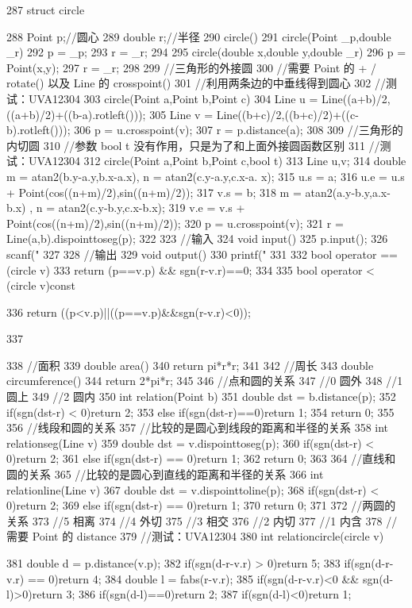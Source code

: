 \documentclass[11pt]{article}
\begin{document}
\begin{Code}
287 struct circle{
288     Point p;//圆心
289     double r;//半径
290     circle(){}
291     circle(Point _p,double _r){
292         p = _p;
293         r = _r;
294     }
295     circle(double x,double y,double _r){
296         p = Point(x,y);
297         r = _r;
298     }
299     //三角形的外接圆
300     //需要 Point 的 + / rotate() 以及 Line 的 crosspoint()
301     //利用两条边的中垂线得到圆心
302     //测试：UVA12304
303     circle(Point a,Point b,Point c){
304         Line u = Line((a+b)/2,((a+b)/2)+((b-a).rotleft()));
305         Line v = Line((b+c)/2,((b+c)/2)+((c-b).rotleft()));
306         p = u.crosspoint(v);
307         r = p.distance(a);
308     }
309     //三角形的内切圆
310     //参数 bool t 没有作用，只是为了和上面外接圆函数区别
311     //测试：UVA12304
312     circle(Point a,Point b,Point c,bool t){
313         Line u,v;
314         double m = atan2(b.y-a.y,b.x-a.x), n = atan2(c.y-a.y,c.x-a.
               x);
315         u.s = a;
316         u.e = u.s + Point(cos((n+m)/2),sin((n+m)/2));
317         v.s = b;
318         m = atan2(a.y-b.y,a.x-b.x) , n = atan2(c.y-b.y,c.x-b.x);
319         v.e = v.s + Point(cos((n+m)/2),sin((n+m)/2));
320         p = u.crosspoint(v);
321         r = Line(a,b).dispointtoseg(p);
322     }
323     //输入
324     void input(){
325         p.input();
326         scanf("%
327     }
328     //输出
329     void output(){
330         printf("%
331     }
332     bool operator == (circle v){
333         return (p==v.p) && sgn(r-v.r)==0;
334     }
335     bool operator < (circle v)const{
336         return ((p<v.p)||((p==v.p)&&sgn(r-v.r)<0));


337       }
338       //面积
339       double area(){
340           return pi*r*r;
341       }
342       //周长
343       double circumference(){
344           return 2*pi*r;
345       }
346       //点和圆的关系
347       //0 圆外
348       //1 圆上
349       //2 圆内
350       int relation(Point b){
351           double dst = b.distance(p);
352           if(sgn(dst-r) < 0)return 2;
353           else if(sgn(dst-r)==0)return 1;
354           return 0;
355       }
356       //线段和圆的关系
357       //比较的是圆心到线段的距离和半径的关系
358       int relationseg(Line v){
359           double dst = v.dispointtoseg(p);
360           if(sgn(dst-r) < 0)return 2;
361           else if(sgn(dst-r) == 0)return 1;
362           return 0;
363       }
364       //直线和圆的关系
365       //比较的是圆心到直线的距离和半径的关系
366       int relationline(Line v){
367           double dst = v.dispointtoline(p);
368           if(sgn(dst-r) < 0)return 2;
369           else if(sgn(dst-r) == 0)return 1;
370           return 0;
371       }
372       //两圆的关系
373       //5 相离
374       //4 外切
375       //3 相交
376       //2 内切
377       //1 内含
378       //需要 Point 的 distance
379       //测试：UVA12304
380       int relationcircle(circle v){
381           double d = p.distance(v.p);
382           if(sgn(d-r-v.r) > 0)return 5;
383           if(sgn(d-r-v.r) == 0)return 4;
384           double l = fabs(r-v.r);
385           if(sgn(d-r-v.r)<0 && sgn(d-l)>0)return 3;
386           if(sgn(d-l)==0)return 2;
387           if(sgn(d-l)<0)return 1;


}}
\end{Code}
\end{document}
